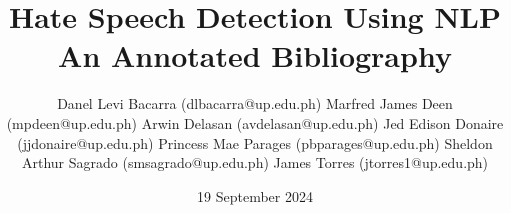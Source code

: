 \documentclass[11pt]{article}
\title{Hate Speech Detection Using NLP\\\medskip An Annotated Bibliography}
\author{
	Danel Levi Bacarra (dlbacarra@up.edu.ph)
	Marfred James Deen (mpdeen@up.edu.ph)
	Arwin Delasan (avdelasan@up.edu.ph)
	Jed Edison Donaire (jjdonaire@up.edu.ph)
	Princess Mae Parages (pbparages@up.edu.ph)
	Sheldon Arthur Sagrado (smsagrado@up.edu.ph)
	James Torres (jtorres1@up.edu.ph)
}
\date{19 September 2024}
\begin{document}
\maketitle
\nocite{*} %


\end{document}
